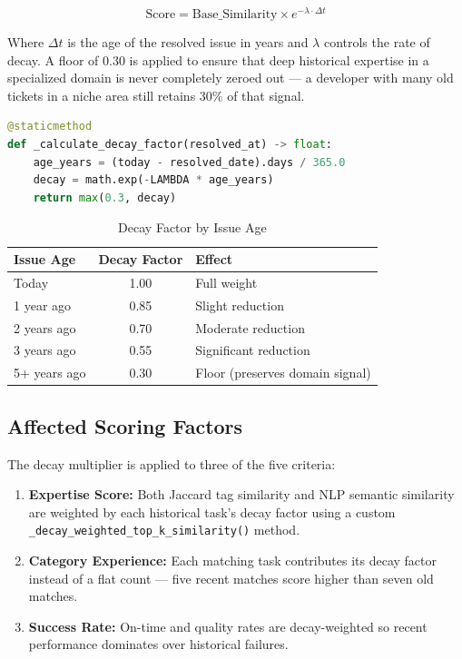 \documentclass[12pt, a4paper]{article}
\begin{document}
\[
\text{Score} = \text{Base\_Similarity} \times e^{-\lambda \cdot \Delta t}
\]

Where $\Delta t$ is the age of the resolved issue in years and $\lambda$ controls the rate of decay. A floor of 0.30 is applied to ensure that deep historical expertise in a specialized domain is never completely zeroed out — a developer with many old tickets in a niche area still retains 30\% of that signal.

\begin{lstlisting}[language=Python, caption={Time-decay formula — scoring\_engine.py}]
@staticmethod
def _calculate_decay_factor(resolved_at) -> float:
    age_years = (today - resolved_date).days / 365.0
    decay = math.exp(-LAMBDA * age_years)
    return max(0.3, decay)
\end{lstlisting}

\begin{table}[H]
\centering
\caption{Decay Factor by Issue Age}
\begin{tabular}{|l|c|l|}
\hline
\textbf{Issue Age} & \textbf{Decay Factor} & \textbf{Effect} \\
\hline
Today         & 1.00 & Full weight \\
1 year ago    & 0.85 & Slight reduction \\
2 years ago   & 0.70 & Moderate reduction \\
3 years ago   & 0.55 & Significant reduction \\
5+ years ago  & 0.30 & Floor (preserves domain signal) \\
\hline
\end{tabular}
\end{table}

\subsection{Affected Scoring Factors}

The decay multiplier is applied to three of the five criteria:

\begin{enumerate}
    \item \textbf{Expertise Score:} Both Jaccard tag similarity and NLP semantic similarity are weighted by each historical task's decay factor using a custom \texttt{\_decay\_weighted\_top\_k\_similarity()} method.
    \item \textbf{Category Experience:} Each matching task contributes its decay factor instead of a flat count — five recent matches score higher than seven old matches.
    \item \textbf{Success Rate:} On-time and quality rates are decay-weighted so recent performance dominates over historical failures.
\end{enumerate}
\end{document}
